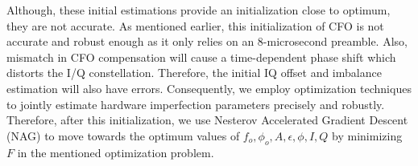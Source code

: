 Although, these initial estimations provide an initialization close to optimum,
they are not accurate. As mentioned earlier, this initialization of CFO
is not accurate and robust enough as it only relies on an 8-microsecond
preamble. Also, mismatch in CFO compensation will cause a time-dependent phase
shift which distorts the I/Q constellation. Therefore, the initial IQ offset
and imbalance estimation will also have errors. Consequently, we employ
optimization techniques to jointly estimate hardware imperfection parameters
precisely and robustly. Therefore, after this initialization, we use Nesterov
Accelerated Gradient Descent (NAG) to move towards the optimum values
of $f_o,\phi_o,A,\epsilon,\phi,I,Q$ by minimizing $F$ in the mentioned
optimization problem.

